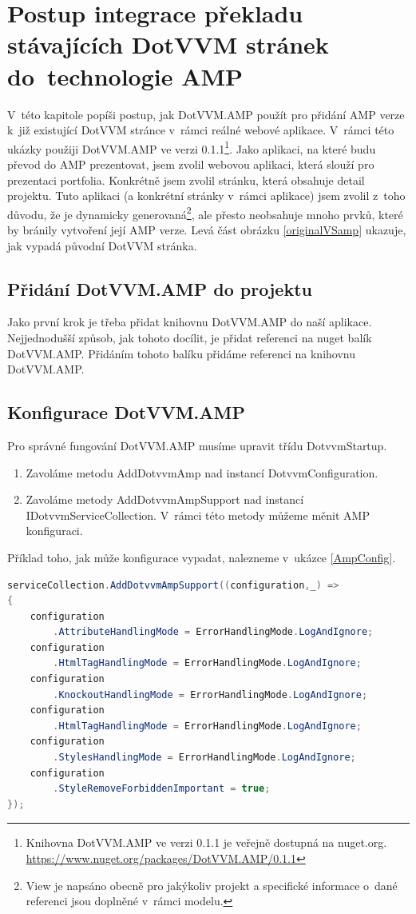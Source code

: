 \chapter{Postup integrace překladu stávajících DotVVM stránek do~technologie AMP}
V~této kapitole popíši postup, jak DotVVM.AMP použít pro přidání AMP verze k~již existující DotVVM stránce v~rámci reálné webové aplikace. V~rámci této ukázky použiji DotVVM.AMP ve verzi 0.1.1\footnote{\label{nuget}Knihovna DotVVM.AMP ve verzi 0.1.1 je veřejně dostupná na nuget.org.\newline
\url{https://www.nuget.org/packages/DotVVM.AMP/0.1.1}}. Jako aplikaci, na které budu převod do AMP prezentovat, jsem zvolil webovou aplikaci, která slouží pro prezentaci portfolia. Konkrétně jsem zvolil stránku, která obsahuje detail projektu. Tuto aplikaci (a konkrétní stránky v~rámci aplikace) jsem zvolil z~toho důvodu, že je dynamicky generovaná\footnote{View je napsáno obecně pro jakýkoliv projekt a specifické informace o~dané referenci jsou doplněné v~rámci modelu. }, ale přesto neobsahuje mnoho prvků, které by bránily vytvoření její AMP verze. Levá část obrázku \ref{originalVSamp} ukazuje, jak vypadá původní DotVVM stránka.

\section{Přidání DotVVM.AMP do projektu}
Jako první krok je třeba přidat knihovnu DotVVM.AMP do naší aplikace. Nejjednodušší způsob, jak tohoto docílit, je přidat referenci na nuget balík DotVVM.AMP. Přidáním tohoto balíku přidáme referenci na knihovnu DotVVM.AMP.
\section*{Konfigurace DotVVM.AMP}
Pro správné fungování DotVVM.AMP musíme upravit třídu DotvvmStartup.
\begin{enumerate}
    \item  Zavoláme metodu AddDotvvmAmp nad instancí DotvvmConfiguration.
    \item Zavoláme metody AddDotvvmAmpSupport nad instancí IDotvvmServiceCollection.\newline
    V~rámci této metody můžeme měnit AMP konfiguraci.
\end{enumerate}
Příklad toho, jak může konfigurace vypadat, nalezneme v~ukázce \ref{AmpConfig}.

\begin{lstlisting}[language=c#, caption=Ukázka možné AMP konfigurace,label=AmpConfig,captionpos=t]
serviceCollection.AddDotvvmAmpSupport((configuration,_) =>
{
	configuration
	    .AttributeHandlingMode = ErrorHandlingMode.LogAndIgnore;
	configuration
	    .HtmlTagHandlingMode = ErrorHandlingMode.LogAndIgnore;
	configuration
	    .KnockoutHandlingMode = ErrorHandlingMode.LogAndIgnore;
	configuration
	    .HtmlTagHandlingMode = ErrorHandlingMode.LogAndIgnore;
	configuration
	    .StylesHandlingMode = ErrorHandlingMode.LogAndIgnore;
	configuration
	    .StyleRemoveForbiddenImportant = true;
});
\end{lstlisting}

